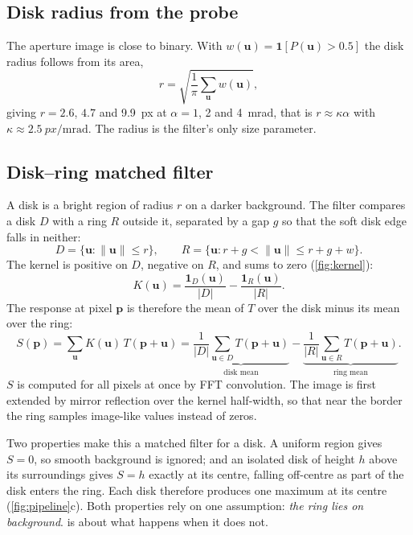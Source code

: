 \documentclass[11pt,a4paper]{article}
\newcommand{\vect}[1]{\bm{#1}}
\newcommand{\ind}{\mathbf{1}}
\begin{document}
\subsection{Disk radius from the probe}
The aperture image is close to binary. With $w(\vect u) = \ind[P(\vect u) > 0.5]$ the disk radius follows from its area,
\begin{equation}
  r = \sqrt{\frac{1}{\pi}\sum_{\vect u} w(\vect u)} ,
  \label{eq:probe}
\end{equation}
giving $r = 2.6$, $4.7$ and \SI{9.9}{px} at $\alpha = 1$, 2 and \SI{4}{\milli\radian}, that is $r \approx \kappa\alpha$ with
$\kappa \approx \SI{2.5}{px\per\milli\radian}$. The radius is the filter's only size parameter.

\subsection{Disk--ring matched filter}
A disk is a bright region of radius $r$ on a darker background. The filter compares a disk $D$ with a ring $R$ outside it,
separated by a gap $g$ so that the soft disk edge falls in neither:
\begin{equation}
  D = \{\vect u : \|\vect u\| \le r\}, \qquad
  R = \{\vect u : r + g < \|\vect u\| \le r + g + w\}.
  \label{eq:sets}
\end{equation}
The kernel is positive on $D$, negative on $R$, and sums to zero (\cref{fig:kernel}):
\begin{equation}
  K(\vect u) = \frac{\ind_D(\vect u)}{|D|} - \frac{\ind_R(\vect u)}{|R|} .
  \label{eq:kernel}
\end{equation}
The response at pixel $\vect p$ is therefore the mean of $T$ over the disk minus its mean over the ring:
\begin{equation}
  S(\vect p) = \sum_{\vect u} K(\vect u)\, T(\vect p + \vect u)
  = \underbrace{\frac{1}{|D|}\sum_{\vect u \in D} T(\vect p + \vect u)}_{\text{disk mean}}
  - \underbrace{\frac{1}{|R|}\sum_{\vect u \in R} T(\vect p + \vect u)}_{\text{ring mean}} .
  \label{eq:corr}
\end{equation}
$S$ is computed for all pixels at once by FFT convolution. The image is first extended by mirror reflection over the
kernel half-width, so that near the border the ring samples image-like values instead of zeros.

Two properties make this a matched filter for a disk. A uniform region gives $S = 0$, so smooth background is ignored;
and an isolated disk of height $h$ above its surroundings gives $S = h$ exactly at its centre, falling off-centre as part
of the disk enters the ring. Each disk therefore produces one maximum at its centre (\cref{fig:pipeline}c). Both properties
rely on one assumption: \emph{the ring lies on background}.  is about what happens when it does not.
\end{document}
